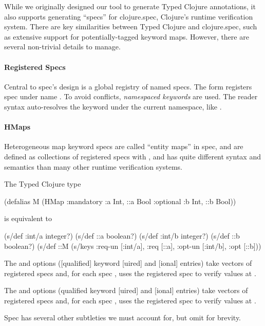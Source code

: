 \label{infer:sec:spec-extension}

While we originally designed our tool to generate Typed Clojure annotations,
it also supports generating ``specs'' for clojure.spec, Clojure's runtime
verification system.
There are key similarities between Typed Clojure and clojure.spec,
such as extensive support for potentially-tagged keyword maps.
However, there are several non-trivial details to manage.


\paragraph{Registered Specs}
Central to spec's design is a global registry of named specs.
The form  registers spec  under name .
To avoid conflicts, \emph{namespaced keywords} are used. The  reader syntax
auto-resolves the keyword under the current namespace, like .

\paragraph{HMaps}
Heterogeneous map keyword specs are called ``entity maps'' in spec, 
and are defined as collections
of registered specs with , and has quite different
syntax and semantics than many other runtime verification systems.

The Typed Clojure type
\begin{cljlisting}
(defalias M (HMap :mandatory {:a Int, ::a Bool}
                  :optional  {:b Int, ::b Bool}))
\end{cljlisting}
is equivalent to
\begin{cljlisting}
(s/def :int/a integer?)
(s/def ::a boolean?)
(s/def :int/b integer?)
(s/def ::b boolean?)
(s/def ::M (s/keys :req-un [:int/a], :req [::a],
                   :opt-un [:int/b], :opt [::b]))
\end{cljlisting}
The  and  options
([qualified] keyword [uired] and [ional] entries)
take vectors of registered specs and, for
each spec , uses the registered spec 
to verify values at .

The  and  options
(qualified keyword [uired] and [ional] entries)
take vectors of registered specs and, for
each spec , uses the registered spec 
to verify values at .

Spec has several other subtleties we must account for, but omit
for brevity.

%
